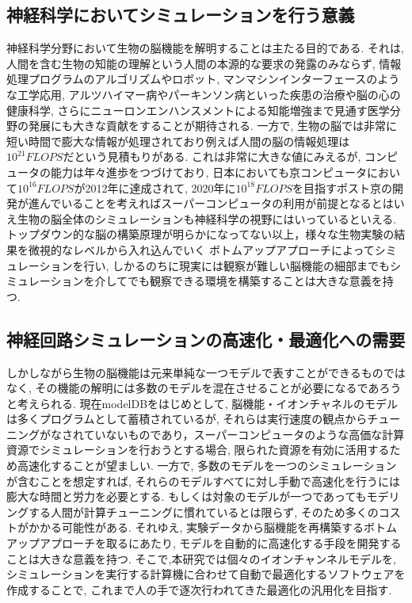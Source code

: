 \subsection{神経科学においてシミュレーションを行う意義}
神経科学分野において生物の脳機能を解明することは主たる目的である.
それは, 人間を含む生物の知能の理解という人間の本源的な要求の発露のみならず,
情報処理プログラムのアルゴリズムやロボット, マンマシンインターフェースのような工学応用,
アルツハイマー病やパーキンソン病といった疾患の治療や脳の心の健康科学, さらにニューロンエンハンスメントによる知能増強まで見通す医学分野の発展にも大きな貢献をすることが期待される.
一方で, 生物の脳では非常に短い時間で膨大な情報が処理されており例えば人間の脳の情報処理は$10^{21}FLOPS$だという見積もりがある\cite{science-roadmap}.
これは非常に大きな値にみえるが, コンピュータの能力は年々進歩をつづけており,
日本においても京コンピュータにおいて$10^{16}FLOPS$が2012年に達成されて,
2020年に$10^{18}FLOPS$を目指すポスト京の開発が進んでいることを考えればスーパーコンピュータの利用が前提となるとはいえ生物の脳全体のシミュレーションも神経科学の視野にはいっているといえる.
トップダウン的な脳の構築原理が明らかになってない以上，様々な生物実験の結果を微視的なレベルから入れ込んでいく ボトムアップアプローチによってシミュレーションを行い,
しかるのちに現実には観察が難しい脳機能の細部までもシミュレーションを介してでも観察できる環境を構築することは大きな意義を持つ.



\subsection{神経回路シミュレーションの高速化・最適化への需要}
しかしながら生物の脳機能は元来単純な一つモデルで表すことができるものではなく,
その機能の解明には多数のモデルを混在させることが必要になるであろうと考えられる.
現在modelDB\cite{model-db}をはじめとして, 脳機能・イオンチャネルのモデルは多くプログラムとして蓄積されているが,
それらは実行速度の観点からチューニングがなされていないものであり，スーパーコンピュータのような高価な計算資源でシミュレーションを行おうとする場合, 限られた資源を有効に活用するため高速化することが望ましい.
一方で, 多数のモデルを一つのシミュレーションが含むことを想定すれば,
それらのモデルすべてに対し手動で高速化を行うには膨大な時間と労力を必要とする.
もしくは対象のモデルが一つであってもモデリングする人間が計算チューニングに慣れているとは限らず,
そのため多くのコストがかかる可能性がある.
それゆえ, 実験データから脳機能を再構築するボトムアップアプローチを取るにあたり,
モデルを自動的に高速化する手段を開発することは大きな意義を持つ.
そこで,本研究では個々のイオンチャンネルモデルを, シミュレーションを実行する計算機に合わせて自動で最適化するソフトウェアを作成することで,
これまで人の手で逐次行われてきた最適化の汎用化を目指す.

